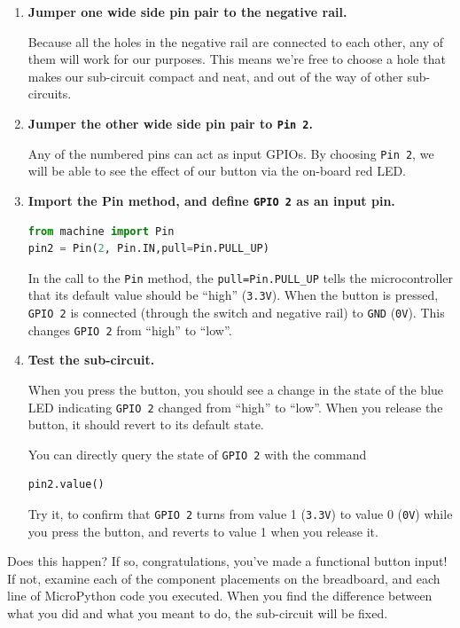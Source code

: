 \begin{enumerate}
	\item  \textbf{Jumper one wide side pin pair to the negative rail.}
	
	Because all the holes in the negative rail are connected to each other, any of them will work for our purposes. This means we're free to choose a hole that makes our sub-circuit compact and neat, and out of the way of other sub-circuits. 

	\item  \textbf{Jumper the other wide side pin pair to \texttt{Pin 2}.}
	
	Any of the numbered pins can act as input GPIOs. By choosing \texttt{Pin 2}, we will be able to see the effect of our button via the on-board red LED.
	

	\item \textbf{Import the Pin method, and define \texttt{GPIO 2} as an input pin.}
\begin{lstlisting}[language=Python]
from machine import Pin 
pin2 = Pin(2, Pin.IN,pull=Pin.PULL_UP) 
\end{lstlisting}	
	In the call to the \texttt{Pin} method, the \texttt{pull=Pin.PULL\_UP} tells the microcontroller that its default value should be ``high'' (\texttt{3.3V}). When the button is pressed, \texttt{GPIO 2} is connected (through the switch and negative rail) to \texttt{GND} (\texttt{0V}). This changes \texttt{GPIO 2} from ``high'' to ``low''.

	\item \textbf{Test the sub-circuit.}
	
	When you press the button, you should see a change in the state of the blue LED indicating \texttt{GPIO 2} changed from ``high'' to ``low''. 
	When you release the button, it should revert to its default state. 
	
	You can directly query the state of \texttt{GPIO 2} with the command
\begin{lstlisting}[language=Python]
pin2.value() 
\end{lstlisting}	
	Try it, to confirm that \texttt{GPIO 2} turns from value 1 (\texttt{3.3V}) to value 0 (\texttt{0V}) while you press the button, and reverts to value 1 when you release it.
	
\end{enumerate}
Does this happen? 
If so, congratulations, you've made a functional button input! 
If not, examine each of the component placements on the breadboard, and each line of MicroPython code you executed. 
When you find the difference between what you did and what you meant to do, the sub-circuit will be fixed.

